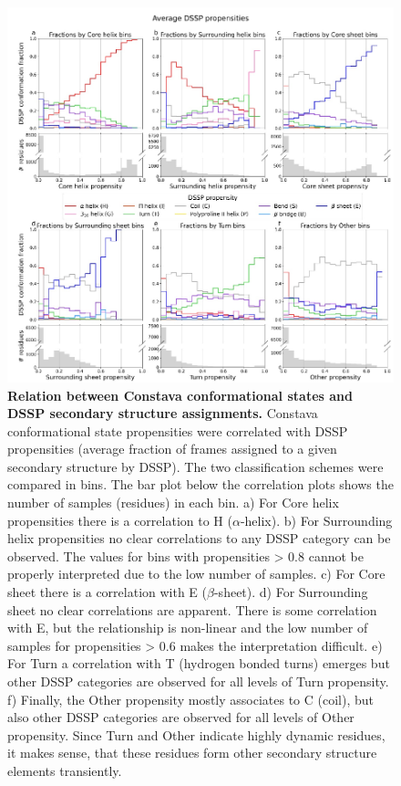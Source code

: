 \begin{figure}[H]
    \centering
    \includegraphics[width=0.9\linewidth]{constava//sup_figs/supfig7.pdf}
    \caption{\textbf{Relation between Constava conformational states and DSSP secondary structure assignments.} Constava conformational state propensities were correlated with DSSP propensities (average fraction of frames assigned to a given secondary structure by DSSP). The two classification schemes were compared in bins. The bar plot below the correlation plots shows the number of samples (residues) in each bin. a) For Core helix propensities there is a correlation to H ($\alpha$-helix). b) For Surrounding helix propensities no clear correlations to any DSSP category can be observed. The values for bins with propensities > 0.8 cannot be properly interpreted due to the low number of samples. c) For Core sheet there is a correlation with E ($\beta$-sheet). d) For Surrounding sheet no clear correlations are apparent. There is some correlation with E, but the relationship is non-linear and the low number of samples for propensities > 0.6 makes the interpretation difficult. e) For Turn a correlation with T (hydrogen bonded turns) emerges but other DSSP categories are observed for all levels of Turn propensity. f) Finally, the Other propensity mostly associates to C (coil), but also other DSSP categories are observed for all levels of Other propensity. Since Turn and Other indicate highly dynamic residues, it makes sense, that these residues form other secondary structure elements transiently.}
    \label{fig:sup_fig_constava:dssp_assignments}
\end{figure}


